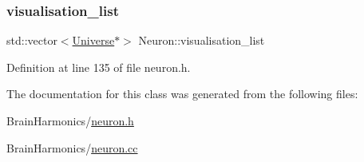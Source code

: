 \subsubsection{\texorpdfstring{visualisation\+\_\+list}{visualisation\_list}}
{\footnotesize\ttfamily std\+::vector$<$\hyperlink{class_universe}{Universe}$\ast$$>$ Neuron\+::visualisation\+\_\+list\hspace{0.3cm}{\ttfamily [protected]}}



Definition at line 135 of file neuron.\+h.



The documentation for this class was generated from the following files\+:\begin{DoxyCompactItemize}
\item 
Brain\+Harmonics/\hyperlink{neuron_8h}{neuron.\+h}\item 
Brain\+Harmonics/\hyperlink{neuron_8cc}{neuron.\+cc}\end{DoxyCompactItemize}

